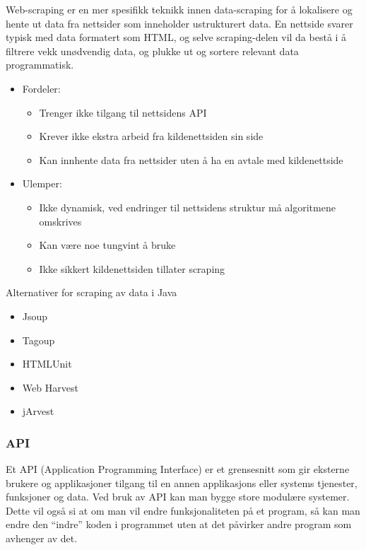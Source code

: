 \documentclass[../main.tex]{subfiles}
\begin{document}
Web-scraping er en mer spesifikk teknikk innen data-scraping for å lokalisere og hente ut data fra nettsider som inneholder ustrukturert data. En nettside svarer typisk med data formatert som HTML, og selve scraping-delen vil da bestå i å filtrere vekk unødvendig data, og plukke ut og sortere relevant data programmatisk.

\begin{itemize}
\item Fordeler:
	\begin{itemize}
	\item Trenger ikke tilgang til nettsidens API
	\item Krever ikke ekstra arbeid fra kildenettsiden sin side
	\item Kan innhente data fra nettsider uten å ha en avtale med kildenettside
	\end{itemize}
\item Ulemper:
	\begin{itemize}
	\item Ikke dynamisk, ved endringer til nettsidens struktur må algoritmene omskrives
	\item Kan være noe tungvint å bruke
	\item Ikke sikkert kildenettsiden tillater scraping
	\end{itemize}
\end{itemize}

Alternativer for scraping av data i Java
\begin{itemize}
\item Jsoup 
\item Tagoup 
\item HTMLUnit 
\item Web Harvest 
\item jArvest 
\end{itemize}

\subsubsection{API}
Et API (Application Programming Interface) er et grensesnitt som gir eksterne brukere og applikasjoner tilgang til en annen applikasjons eller systems tjenester, funksjoner og data. Ved bruk av API kan man bygge store modulære systemer. Dette vil også si at om man vil endre funksjonaliteten på et program, så kan man endre den “indre” koden i programmet uten at det påvirker andre program som avhenger av det.
\end{document}
